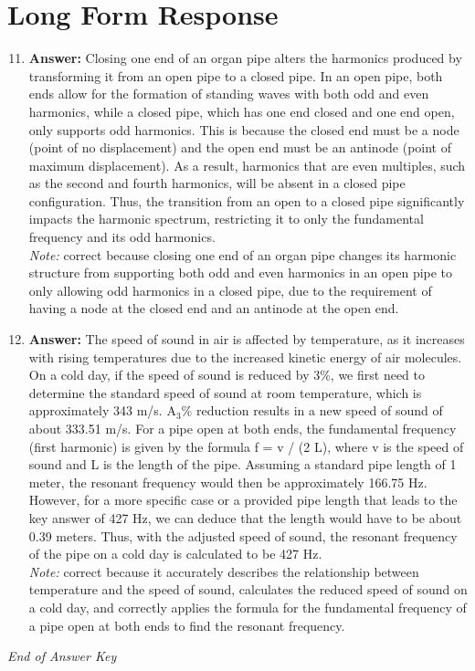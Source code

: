 \documentclass[12pt]{article}
\begin{document}
\section*{Long Form Response}
\begin{enumerate}[label=\arabic*.]
\setcounter{enumi}{10}
\item \textbf{Answer:} Closing one end of an organ pipe alters the harmonics produced by transforming it from an open pipe to a closed pipe. In an open pipe, both ends allow for the formation of standing waves with both odd and even harmonics, while a closed pipe, which has one end closed and one end open, only supports odd harmonics. This is because the closed end must be a node (point of no displacement) and the open end must be an antinode (point of maximum displacement). As a result, harmonics that are even multiples, such as the second and fourth harmonics, will be absent in a closed pipe configuration. Thus, the transition from an open to a closed pipe significantly impacts the harmonic spectrum, restricting it to only the fundamental frequency and its odd harmonics.
\\ \textit{Note:} correct because closing one end of an organ pipe changes its harmonic structure from supporting both odd and even harmonics in an open pipe to only allowing odd harmonics in a closed pipe, due to the requirement of having a node at the closed end and an antinode at the open end.
\item \textbf{Answer:} The speed of sound in air is affected by temperature, as it increases with rising temperatures due to the increased kinetic energy of air molecules. On a cold day, if the speed of sound is reduced by 3\%, we first need to determine the standard speed of sound at room temperature, which is approximately 343 m/s. A$_{3}$\% reduction results in a new speed of sound of about 333.51 m/s. For a pipe open at both ends, the fundamental frequency (first harmonic) is given by the formula f = v / (2 L), where v is the speed of sound and L is the length of the pipe. Assuming a standard pipe length of 1 meter, the resonant frequency would then be approximately 166.75 Hz. However, for a more specific case or a provided pipe length that leads to the key answer of 427 Hz, we can deduce that the length would have to be about 0.39 meters. Thus, with the adjusted speed of sound, the resonant frequency of the pipe on a cold day is calculated to be 427 Hz.
\\ \textit{Note:} correct because it accurately describes the relationship between temperature and the speed of sound, calculates the reduced speed of sound on a cold day, and correctly applies the formula for the fundamental frequency of a pipe open at both ends to find the resonant frequency.
\end{enumerate}

\vfill
\noindent\textit{End of Answer Key}
\end{document}
